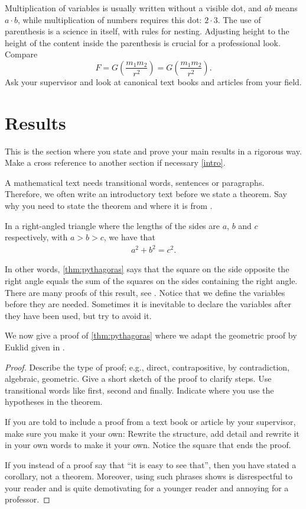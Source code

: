 \documentclass[UKenglish,bachelor]{uiomaster}  %
\begin{document}
Multiplication of variables is usually written without a visible dot, and $ab$ means $a\cdot b$, while multiplication of numbers requires this dot: $2\cdot3$. The use of parenthesis is a science in itself, with rules for nesting. Adjusting height to the height of the content inside the parenthesis is crucial for a professional look. Compare
\[ 
F = G \left( \frac{m_1 m_2}{r^2} \right) = G ( \frac{m_1 m_2}{r^2}).
\]
Ask your supervisor and look at canonical text books and articles from your field.


\section{Results}  %
\label{results}
This is the section where you state and prove your main results in a rigorous way. Make a cross reference to another section if necessary \cref{intro}.

A mathematical text needs transitional words, sentences or paragraphs. Therefore, we often write an introductory text before we state a theorem. Say why you need to state the theorem and where it is from \cite[Theorem~1]{Mao19}. 

\begin{theorem}[Pythagoras]
    \label{thm:pythagoras}
In a right-angled triangle where the lengths of the sides are $a$, $b$ and $c$ respectively, with $a > b > c$, we have that
    \begin{align}
        \label{eq:pythagoras}
            a^2 + b^2 = c^2.
    \end{align}
\end{theorem}

In other words, \cref{thm:pythagoras} says that the square on the side opposite the right angle equals the sum of the squares on the sides containing the right angle. There are many proofs of this result, see \cite{Mao19}. Notice that we define the variables before they are needed. Sometimes it is inevitable to declare the variables after they have been used, but try to avoid it.

 We now give a proof of \cref{thm:pythagoras} where we adapt the geometric proof by Euklid given in \cite[35]{Mao19}.

\begin{proof}
Describe the type of proof; e.g., direct, contrapositive, by contradiction, algebraic, geometric. Give a short sketch of the proof to clarify steps. Use transitional words like first, second and finally. Indicate where you use the hypotheses in the theorem. 

If you are told to include a proof from a text book or article by your supervisor, make sure you make it your own: Rewrite the structure, add detail and rewrite it in your own words to make it your own. Notice the square that ends the proof.

If you instead of a proof say that \enquote{it is easy to see that}, then you have stated a corollary, not a theorem. Moreover, using such phrases shows is disrespectful to your reader and is quite demotivating for a younger reader and annoying for a professor. 
\end{proof}
\end{document}
